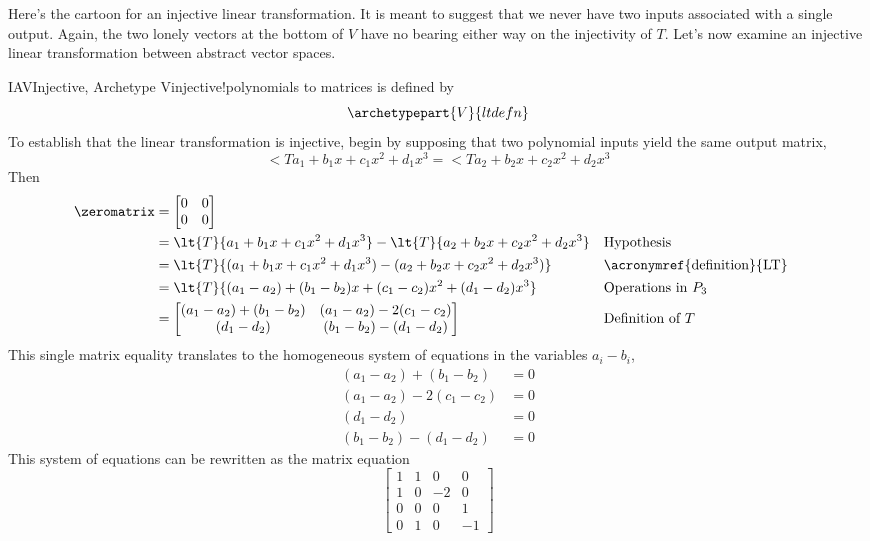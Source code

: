 %
Here's the cartoon for an injective linear transformation.  It is meant to suggest that we never have two inputs associated with a single output.  Again, the two lonely vectors at the bottom of $V$ have no bearing either way on the injectivity of $T$.
%
%
Let's now examine an injective linear transformation between abstract vector spaces.
%
\begin{example}{IAV}{Injective, Archetype V}{injective!polynomials to matrices}
 is defined by
%
\begin{equation*}
\archetypepart{V}{ltdefn}
\end{equation*}
%
To establish that the linear transformation is injective, begin by supposing that two polynomial inputs yield the same output matrix,
%
\begin{equation*}
\lt{T}{a_1+b_1x+c_1x^2+d_1x^3}=\lt{T}{a_2+b_2x+c_2x^2+d_2x^3}
\end{equation*}
%
Then
%
\begin{align*}
\zeromatrix
&=\begin{bmatrix}
0&0\\0&0
\end{bmatrix}\\
&=\lt{T}{a_1+b_1x+c_1x^2+d_1x^3}-\lt{T}{a_2+b_2x+c_2x^2+d_2x^3}&&\text{Hypothesis}\\
&=\lt{T}{(a_1+b_1x+c_1x^2+d_1x^3)-(a_2+b_2x+c_2x^2+d_2x^3)}&&\text{\acronymref{definition}{LT}}\\
&=\lt{T}{(a_1-a_2)+(b_1-b_2)x+(c_1-c_2)x^2+(d_1-d_2)x^3}&&\text{Operations in $P_3$}\\
&=
\begin{bmatrix}
(a_1-a_2)+(b_1-b_2) & (a_1-a_2)-2(c_1-c_2)\\
(d_1-d_2) & (b_1-b_2)-(d_1-d_2)
\end{bmatrix}&&\text{Definition of $T$}
%
\end{align*}
%
This single matrix equality translates to the homogeneous system of equations in the variables $a_i-b_i$,
%
\begin{align*}
(a_1-a_2)+(b_1-b_2)&=0\\
(a_1-a_2)-2(c_1-c_2)&=0\\
(d_1-d_2)&=0\\
(b_1-b_2)-(d_1-d_2)&=0
\end{align*}
%
This system of equations can be rewritten as the matrix equation
%
\begin{equation*}
\begin{bmatrix}
1&1&0&0\\1&0&-2&0\\0&0&0&1\\0&1&0&-1

\end{bmatrix}
\end{equation*}
\end{example}
